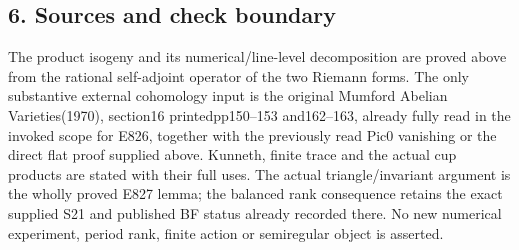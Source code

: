 \subsection{6. Sources and check boundary}\label{SF-E829:sources-and-check-boundary}

The product isogeny and its numerical/line-level decomposition are proved
above from the rational self-adjoint operator of the two Riemann forms. The
only substantive external cohomology input is the original Mumford Abelian
Varieties(1970), section16 printedpp150--153 and162--163, already fully read
in the invoked scope for E826, together with the previously read Pic0
vanishing or the direct flat proof supplied above. Kunneth, finite trace and
the actual cup products are stated with their full uses. The actual
triangle/invariant argument is the wholly proved E827 lemma; the balanced
rank consequence retains the exact supplied S21 and published BF status
already recorded there. No new numerical experiment, period rank, finite
action or semiregular object is asserted.
